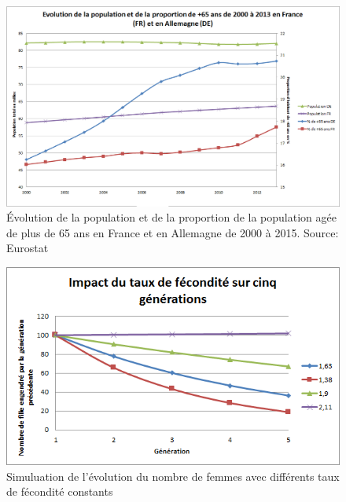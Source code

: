 \begin{figure}[p]
    \begin{center}
        \includegraphics[scale=0.55]{document/fr-de_comparaison.png}
        \caption{Évolution de la population et de la proportion de la population agée de plus de 65 ans en France et en Allemagne de 2000 à 2015. Source: Eurostat~\citep{eurostat_pop}}
        \label{fr-de_comparaison}
    \end{center}
\end{figure}

\begin{figure}[p]
    \begin{center}
        \includegraphics[scale=0.8]{document/fecondite.png}
        \caption{Simuluation de l'évolution du nombre de femmes avec différents taux de fécondité constants}
        \label{fecondite}
    \end{center}
\end{figure}

